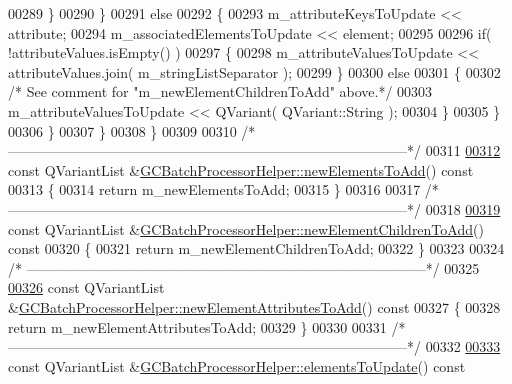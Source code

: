 \begin{DoxyCode}
00289         \}
00290       \}
00291       \textcolor{keywordflow}{else}
00292       \{
00293         m\_attributeKeysToUpdate << attribute;
00294         m\_associatedElementsToUpdate << element;
00295 
00296         \textcolor{keywordflow}{if}( !attributeValues.isEmpty() )
00297         \{
00298           m\_attributeValuesToUpdate << attributeValues.join( 
      m\_stringListSeparator );
00299         \}
00300         \textcolor{keywordflow}{else}
00301         \{
00302           \textcolor{comment}{/* See comment for "m\_newElementChildrenToAdd" above.*/}
00303           m\_attributeValuesToUpdate << QVariant( QVariant::String );
00304         \}
00305       \}
00306     \}
00307   \}
00308 \}
00309 
00310 \textcolor{comment}{/*
      --------------------------------------------------------------------------------------*/}
00311 
\hypertarget{gcbatchprocessorhelper_8cpp_source_l00312}{}\hyperlink{class_g_c_batch_processor_helper_afdedbc674698c019ebd2a3938a239661}{00312} \textcolor{keyword}{const} QVariantList &\hyperlink{class_g_c_batch_processor_helper_afdedbc674698c019ebd2a3938a239661}{GCBatchProcessorHelper::newElementsToAdd}()\textcolor{keyword}{ const}
00313 \textcolor{keyword}{}\{
00314   \textcolor{keywordflow}{return} m\_newElementsToAdd;
00315 \}
00316 
00317 \textcolor{comment}{/*
      --------------------------------------------------------------------------------------*/}
00318 
\hypertarget{gcbatchprocessorhelper_8cpp_source_l00319}{}\hyperlink{class_g_c_batch_processor_helper_a89c14c3740c7cb57c937ef8db99b4af1}{00319} \textcolor{keyword}{const} QVariantList &\hyperlink{class_g_c_batch_processor_helper_a89c14c3740c7cb57c937ef8db99b4af1}{GCBatchProcessorHelper::newElementChildrenToAdd}()\textcolor{keyword}{ const}
00320 \textcolor{keyword}{}\{
00321   \textcolor{keywordflow}{return} m\_newElementChildrenToAdd;
00322 \}
00323 
00324 \textcolor{comment}{/*
      --------------------------------------------------------------------------------------*/}
00325 
\hypertarget{gcbatchprocessorhelper_8cpp_source_l00326}{}\hyperlink{class_g_c_batch_processor_helper_a640ca9bd78b7da0796fdfb82fefce8b6}{00326} \textcolor{keyword}{const} QVariantList &\hyperlink{class_g_c_batch_processor_helper_a640ca9bd78b7da0796fdfb82fefce8b6}{GCBatchProcessorHelper::newElementAttributesToAdd}()\textcolor{keyword}{ const}
00327 \textcolor{keyword}{}\{
00328   \textcolor{keywordflow}{return} m\_newElementAttributesToAdd;
00329 \}
00330 
00331 \textcolor{comment}{/*
      --------------------------------------------------------------------------------------*/}
00332 
\hypertarget{gcbatchprocessorhelper_8cpp_source_l00333}{}\hyperlink{class_g_c_batch_processor_helper_aca0a2d6bbfcb23907e917b5d2251fc6f}{00333} \textcolor{keyword}{const} QVariantList &\hyperlink{class_g_c_batch_processor_helper_aca0a2d6bbfcb23907e917b5d2251fc6f}{GCBatchProcessorHelper::elementsToUpdate}()\textcolor{keyword}{ const}

\end{DoxyCode}
